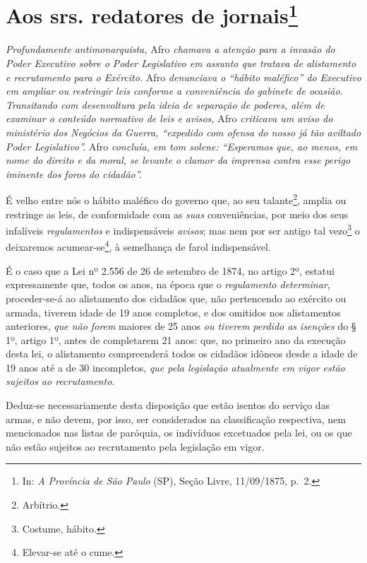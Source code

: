 \chapter{Aos srs. redatores de jornais\footnote{ In: \emph{A Província de São Paulo} (SP), Seção Livre,
  11/09/1875, p.~2.}} %

\begin{didascalia}
\emph{Profundamente antimonarquista,} Afro \emph{chamava a atenção para
a invasão do Poder Executivo sobre o Poder Legislativo em assunto que
tratava de alistamento e recrutamento para o Exército.} Afro
\emph{denunciava o ``hábito maléfico'' do Executivo em ampliar ou
restringir leis conforme a conveniência do gabinete de ocasião.
Transitando com desenvoltura pela ideia de separação de poderes, além de
examinar o conteúdo normativo de leis e avisos,} Afro \emph{criticava um
aviso do ministério dos Negócios da Guerra, ``expedido com ofensa do
nosso já tão aviltado Poder Legislativo''.} Afro \emph{concluía, em tom
solene: ``Esperamos que, ao menos, em nome do direito e da moral, se
levante o clamor da imprensa contra esse perigo iminente dos foros do
cidadão''.}
\end{didascalia}

\asterisc{}

É velho entre nós o hábito maléfico do governo que, ao seu
talante\footnote{ Arbítrio.}, amplia ou restringe as leis, de
conformidade com as \emph{suas} conveniências, por meio dos seus
infalíveis \emph{regulamentos} e indispensáveis \emph{avisos}; mas nem
por ser antigo tal vezo\footnote{ Costume, hábito.} o deixaremos
acumear-se\footnote{ Elevar-se até o cume.}, à semelhança de farol
indispensável.

É o caso que a Lei nº 2.556 de 26 de setembro de 1874, no artigo 2º,
estatui expressamente que, todos os anos, na época que o
\emph{regulamento determinar}, proceder-se-á ao alistamento dos cidadãos
que, não pertencendo ao exército ou armada, tiverem idade de 19 anos
completos, e dos omitidos nos alistamentos anteriores, \emph{que não
forem} maiores de 25 anos \emph{ou tiverem perdido as isenções} do § 1º,
artigo 1º, antes de completarem 21 anos: que, no primeiro ano da
execução desta lei, o alistamento compreenderá todos os cidadãos idôneos
desde a idade de 19 anos até a de 30 incompletos, \emph{que pela
legislação atualmente em vigor estão sujeitos ao recrutamento}.

Deduz-se necessariamente desta disposição que estão isentos do serviço
das armas, e não devem, por isso, ser considerados na classificação
respectiva, nem mencionados nas listas de paróquia, os indivíduos
excetuados pela lei, ou os que não estão sujeitos ao recrutamento pela
legislação em vigor.

